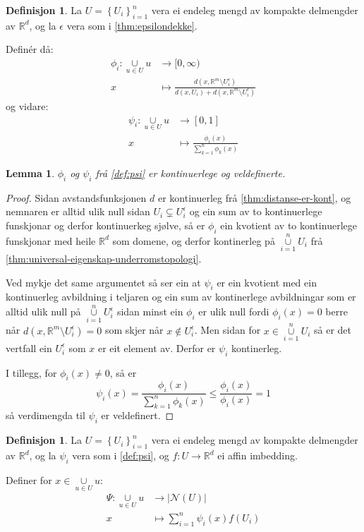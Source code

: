 \documentclass[a4paper, 12pt, norsk]{article}
\theoremstyle{plain}
\newtheorem{lemma}[theorem]{Lemma}
\theoremstyle{definition}
\newtheorem{definition}[theorem]{Definisjon}
\newcommand{\Rb}{\mathbb{R}}
\newcommand{\Nc}{\mathcal{N}}
\newcommand{\union}{ \mathop{\cup}\limits }
\newcommand{\gr}[1]{ \lvert #1 \rvert } %
\newcommand{\set}[1]{ \left\{ #1 \right\} } %
\begin{document}
\begin{definition} \label{def:psi}
	La \( U = \set{U_i}_{i=1}^n \) vera ei endeleg mengd av kompakte delmengder av \( \Rb^d \), og la \( \epsilon \) vera som i \autoref{thm:epsilondekke}.

	Definér då:
	\begin{align*}
		\phi_i : \union_{u \in U} u &\to [0, \infty) \\
		x &\mapsto \frac{d(x, \Rb^m \setminus U_i^\epsilon)}{d(x, U_i) + d(x, \Rb^m \setminus U_i^\epsilon)}
	\end{align*}
	og vidare:
	\begin{align*}
		\psi_i : \union_{u \in U} u &\to [0, 1] \\
		x &\mapsto \frac{\phi_i(x)}{\sum_{k=1}^n \phi_k(x)}
	\end{align*}
\end{definition}

\begin{lemma}
	\( \phi_i \) og \( \psi_i \) frå \autoref{def:psi} er kontinuerlege og veldefinerte.
\end{lemma}

\begin{proof} 
	Sidan avstandsfunksjonen \( d \) er kontinuerleg frå \autoref{thm:distanse-er-kont}, og nemnaren er alltid ulik null sidan \( U_i \subsetneq U_i^\epsilon \) og ein sum av to kontinuerlege funskjonar og derfor kontinuerkeg sjølve, så er \( \phi_i \) ein kvotient av to kontinuerlege funskjonar med heile \( \Rb^d \) som domene, og derfor kontinerleg på \( \union_{i=1}^n U_i \) frå \autoref{thm:universal-eigenskap-underromstopologi}.

	Ved mykje det same argumentet så ser ein at \( \psi_i \) er ein kvotient med ein kontinuerleg avbildning i teljaren og ein sum av kontinerlege avbildningar som er alltid ulik null på \( \union_{i=1}^n U_i^\epsilon \) sidan minst ein \( \phi_i \) er ulik null fordi \( \phi_i(x)=0 \) berre når \( d(x, \Rb^m \setminus U_i^\epsilon)=0 \) som skjer når \( x \not\in U_i^\epsilon \). Men sidan for \( x \in \union_{i=1}^n U_i \) så er det vertfall ein \( U_i^\epsilon \) som \( x \) er eit element av. Derfor er \( \psi_i \) kontinerleg.

	I tillegg, for \( \phi_i(x) \neq 0 \), så er
	\[
		\psi_i(x) = \frac{\phi_i(x)}{\sum_{k=1}^n \phi_k(x)} \leq \frac{\phi_i(x)}{\phi_i(x)} = 1
	\]
	så verdimengda til \( \psi_i \) er veldefinert.
\end{proof}

\begin{definition} \label{def:Psi}
	La \( U = \set{U_i}_{i=1}^n \) vera ei endeleg mengd av kompakte delmengder av \( \Rb^d \), og la \( \psi_i \) vera som i \autoref{def:psi}, og \( f: U \to \Rb^d \) ei affin imbedding. 
	
	Definer for \( x \in \union_{u \in U} u \):
	\begin{align*}
		\Psi : \union_{u \in U} u &\to \gr{\Nc(U)} \\
		x &\mapsto \sum_{i=1}^n \psi_i(x)f(U_i)
	\end{align*}
\end{definition}
\end{document}
